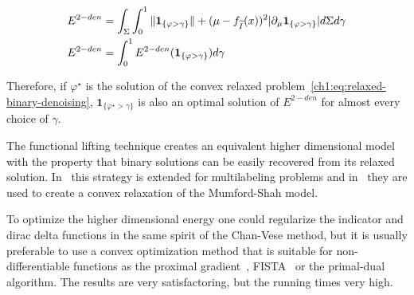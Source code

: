 \begin{align*}
	 E^{2-den} &= \int_{\Sigma}{ \int_{0}^{1}{{\lVert \mathbf{1}_{\{\varphi > \gamma\}}\rVert  + (\mu -f_{\widetilde{I}}(x))^2|\partial_\mu \mathbf{1}_{\{\varphi > \gamma\}}| d\Sigma}d\gamma}} \\
	 E^{2-den} &= \int_{0}^{1}{ E^{2-den}( \mathbf{1}_{\{\varphi > \gamma\}} )d\gamma }
\end{align*}

Therefore, if $\varphi^{\star}$ is the solution of the convex relaxed problem~\cref{ch1:eq:relaxed-binary-denoising}, $\mathbf{1}_{\{\varphi^{\star} > \gamma \}}$ is also an optimal solution of $E^{2-den}$ for almost every choice of $\gamma$. 

The functional lifting technique creates an equivalent higher dimensional model with the property that binary solutions can be easily recovered from its relaxed solution. In~\cite{pock08} this strategy is extended for multilabeling problems and in~\cite{pock09,strekalovskiy12} they are used to create a convex relaxation of the Mumford-Shah model.

To optimize the higher dimensional energy one could regularize the indicator and dirac delta functions in the same spirit of the Chan-Vese method, but it is usually preferable to use a convex optimization method that is suitable for non-differentiable functions as the proximal gradient~\cite{chambolle04}, FISTA~\cite{beck09a} or the primal-dual~\cite{chambolle11} algorithm. The results are very satisfactoring, but the running times  very high.







